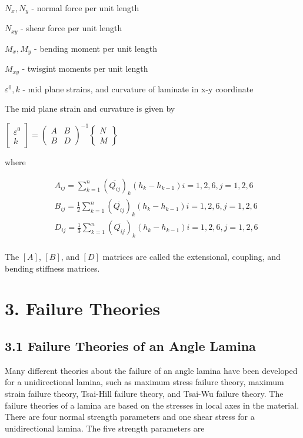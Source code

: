 \documentclass[Afour,sagev,times]{sagej}
\begin{document}
$N_x,N_y$ - normal force per unit length

$N_{xy}$ - shear force per unit length

$M_x,M_y$ - bending moment per unit length

$M_{xy}$ - twisgint moments per unit length

$\varepsilon^0, k$ - mid plane strains, and curvature  of laminate in x-y coordinate

The mid plane strain and curvature is given by

$
\left[\begin{array}{l}\varepsilon^{0} \\ k\end{array}\right]=\left(\begin{array}{ll}A & B \\ B & D\end{array}\right)^{-1}\left\{\begin{array}{l}N \\ M\end{array}\right\}
$






where

\begin{equation}
    \begin{split}
    &A_{ij}
	=
	\sum_{k=1}^n(\overline{Q_{ij}})_k(h_k-h_{k-1})  i=1,2,6, j=1,2,6\\
    &B_{ij}
	=
	\frac{1}{2}\sum_{k=1}^n(\overline{Q_{ij}})_k(h_k-h_{k-1})  i=1,2,6, j=1,2,6\\
    &D_{ij}
	=
	\frac{1}{3}\sum_{k=1}^n(\overline{Q_{ij}})_k(h_k-h_{k-1}) i=1,2,6, j=1,2,6\\
    \end{split}
\end{equation}

The $[A]$, $[B]$, and $[D]$ matrices are called the extensional, coupling, and bending stiffness
matrices. 


\section{3. Failure Theories}
\subsection{3.1 Failure Theories of an Angle Lamina}
Many different theories about the failure of an angle lamina have been developed for a
unidirectional lamina, such as maximum stress failure theory, maximum strain failure theory,
Tsai-Hill failure theory, and Tsai-Wu failure theory. The failure theories of a lamina are based on
the stresses in local axes in the material. There are four normal strength parameters and one shear
stress for a unidirectional lamina. The five strength parameters are
\end{document}
